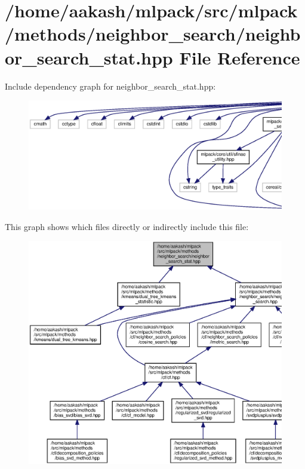 \section{/home/aakash/mlpack/src/mlpack/methods/neighbor\+\_\+search/neighbor\+\_\+search\+\_\+stat.hpp File Reference}
\label{neighbor__search__stat_8hpp}
Include dependency graph for neighbor\+\_\+search\+\_\+stat.\+hpp\+:
\nopagebreak
\begin{figure}[H]
\begin{center}
\leavevmode
\includegraphics[width=350pt]{neighbor__search__stat_8hpp__incl}
\end{center}
\end{figure}
This graph shows which files directly or indirectly include this file\+:
\nopagebreak
\begin{figure}[H]
\begin{center}
\leavevmode
\includegraphics[width=350pt]{neighbor__search__stat_8hpp__dep__incl}
\end{center}
\end{figure}
